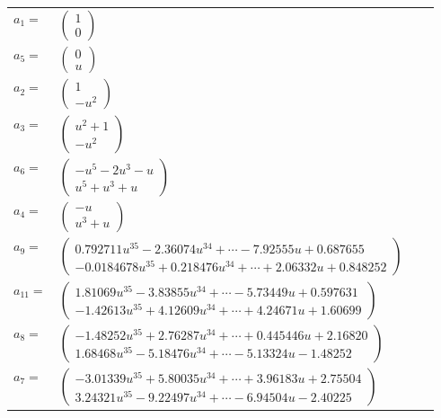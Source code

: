 \documentclass[1p]{elsarticle_modified}
\theoremstyle{definition}
\begin{document}
\begin{tabular}{m{7pt} m{180pt} m{7pt} m{180pt} }
\flushright $a_{1}=$&$\begin{pmatrix}1\\0\end{pmatrix}$ \\
\flushright $a_{5}=$&$\begin{pmatrix}0\\u\end{pmatrix}$ \\
\flushright $a_{2}=$&$\begin{pmatrix}1\\- u^2\end{pmatrix}$ \\
\flushright $a_{3}=$&$\begin{pmatrix}u^2+1\\- u^2\end{pmatrix}$ \\
\flushright $a_{6}=$&$\begin{pmatrix}- u^5-2 u^3- u\\u^5+u^3+u\end{pmatrix}$ \\
\flushright $a_{4}=$&$\begin{pmatrix}- u\\u^3+u\end{pmatrix}$ \\
\flushright $a_{9}=$&$\begin{pmatrix}0.792711 u^{35}-2.36074 u^{34}+\cdots-7.92555 u+0.687655\\-0.0184678 u^{35}+0.218476 u^{34}+\cdots+2.06332 u+0.848252\end{pmatrix}$ \\
\flushright $a_{11}=$&$\begin{pmatrix}1.81069 u^{35}-3.83855 u^{34}+\cdots-5.73449 u+0.597631\\-1.42613 u^{35}+4.12609 u^{34}+\cdots+4.24671 u+1.60699\end{pmatrix}$ \\
\flushright $a_{8}=$&$\begin{pmatrix}-1.48252 u^{35}+2.76287 u^{34}+\cdots+0.445446 u+2.16820\\1.68468 u^{35}-5.18476 u^{34}+\cdots-5.13324 u-1.48252\end{pmatrix}$ \\
\flushright $a_{7}=$&$\begin{pmatrix}-3.01339 u^{35}+5.80035 u^{34}+\cdots+3.96183 u+2.75504\\3.24321 u^{35}-9.22497 u^{34}+\cdots-6.94504 u-2.40225\end{pmatrix}$ \\

\end{tabular}
\end{document}
